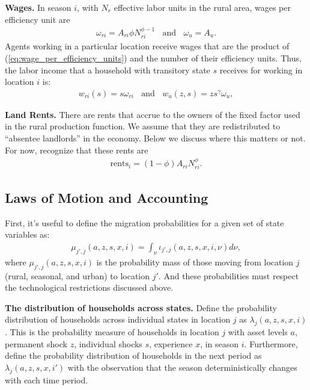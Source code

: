 \documentclass[12pt,pdftex]{article}
\begin{document}
\begin{onehalfspacing}
\textbf{Wages.} In season $i$, with $N_r$ effective labor units in the rural area, wages per efficiency unit are
\begin{align}
\omega_{ri} = A_{ri} \phi N_{ri}^{\phi-1}  \ \ \ \  \mbox{and} \ \ \ \ \omega_u = A_u.
\label{eq:wage_per_efficiency_units}
\end{align}
Agents working in a particular location receive wages that are the product of (\ref{eq:wage_per_efficiency_units}) and the number of their efficiency units. Thus, the labor income that a household  with transitory state $s$ receives for working in location $i$ is:
\begin{align}
w_{ri}(s) = s \omega_{ri} \ \ \ \ \mbox{and} \ \ \ \ w_{u}(z,s) = z s^{\gamma} \omega_u,
\label{eq:wages}
\end{align}

\textbf{Land Rents.} There are rents that accrue to the owners of the fixed factor used in the rural production function. We assume that they are redistributed to ``absentee landlords'' in the economy. Below we discuss where this matters or not. For now, recognize that these rents are
\begin{align}
\mbox{rents}_{i} = (1-\phi) A_{ri} N_{ri}^{\phi}.
\label{eq:rents}
\end{align}


\subsection{Laws of Motion and Accounting}

First, it's useful to define the migration probabilities for a given set of state variables as:
\begin{align}
\mu_{j',j}(a, z, s,  x, i) = \int_{\nu} \iota_{j',j}(a, z, s, x, i, \nu) d\nu,
\end{align}
where $\mu_{j',j}(a, z, s, x, i)$ is the probability mass of those moving from location $j$ (rural, seasonal, and urban) to location $j'$. And these probabilities must respect the technological restrictions discussed above.

\textbf{The distribution of households across states.} Define the probability distribution of households across individual states in location $j$ as $\lambda_{j}(a, z, s, x, i)$. This is the probability measure of households in location $j$ with asset levels $a$, permanent shock $z$, individual shocks $s$, experience $x$, in season $i$. Furthermore, define the probability distribution of households in the next period as $\lambda_{j}(a, z, s, x, i')$ with the observation that the season deterministically changes with each time period.


\end{onehalfspacing}
\end{document}
